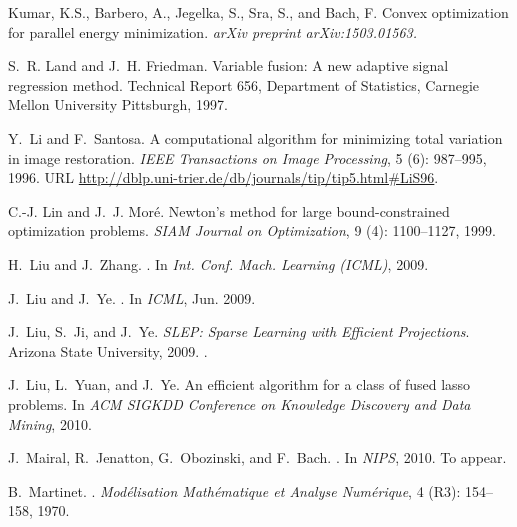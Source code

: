 \documentclass[twoside,11pt]{article}
\numberwithin{equation}{section}
\numberwithin{theorem}{section}
\begin{document}
\begin{thebibliography}{86}
Kumar, K.S., Barbero, A., Jegelka, S., Sra, S., and Bach, F.
\newblock Convex optimization for parallel energy minimization.
\newblock \emph{arXiv preprint arXiv:1503.01563.}

S.~R. Land and J.~H. Friedman.
\newblock Variable fusion: A new adaptive signal regression method.
\newblock Technical Report 656, Department of Statistics, Carnegie Mellon
  University Pittsburgh, 1997.

Y.~Li and F.~Santosa.
\newblock A computational algorithm for minimizing total variation in image
  restoration.
\newblock \emph{IEEE Transactions on Image Processing}, 5
  (6): 987--995, 1996.
\newblock URL \url{http://dblp.uni-trier.de/db/journals/tip/tip5.html#LiS96}.

C.-J. Lin and J.~J. Mor{\'e}.
\newblock Newton's method for large bound-constrained optimization problems.
\newblock \emph{SIAM Journal on Optimization}, 9 (4):
  1100--1127, 1999.

H.~Liu and J.~Zhang.
.
\newblock In \emph{Int. Conf. Mach. Learning (ICML)}, 2009.

J.~Liu and J.~Ye.
.
\newblock In \emph{ICML}, Jun. 2009.

J.~Liu, S.~Ji, and J.~Ye.
\newblock \emph{{SLEP: Sparse Learning with Efficient Projections}}.
\newblock Arizona State University, 2009.
.

J.~Liu, L.~Yuan, and J.~Ye.
\newblock An efficient algorithm for a class of fused lasso problems.
\newblock In \emph{ACM SIGKDD Conference on Knowledge Discovery and Data
  Mining}, 2010.

J.~Mairal, R.~Jenatton, G.~Obozinski, and F.~Bach.
.
\newblock In \emph{NIPS}, 2010.
\newblock To appear.

B.~Martinet.
.
\newblock \emph{Modélisation Mathématique et Analyse Numérique}, 4
  (R3): 154--158, 1970.


\end{thebibliography}
\end{document}
